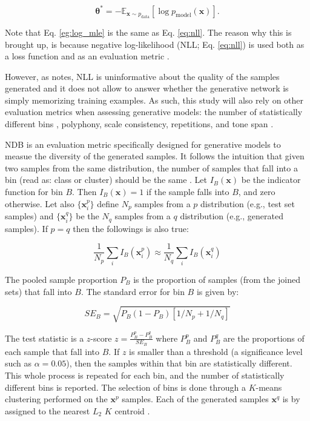\documentclass[a4paper]{book}
\begin{document}
\begin{equation}
    \bm{\theta^*} = - \mathbb{E}_{\mathbf{x} \sim p_{\text{data}}} [\log p_{\text{model}} (\bm{x})] \label{eq:nll}.
\end{equation}

Note that Eq. \ref{eg:log_mle} is the same as Eq. \ref{eq:nll}. The reason why this is brought up, is because negative log-likelihood (NLL; Eq. \ref{eq:nll}) is used both as a loss function and as an evaluation metric \parencite[also for generative models;][]{yu_seqgan_2016, borji_pros_2018}.

However, as \textcite{borji_pros_2018} notes, NLL is uninformative about the quality of the samples generated and it does not allow to answer whether the generative network is simply memorizing training examples. As such, this study will also rely on other evaluation metrics when assessing generative models: the number of statistically different bins \parencite[NDB;][]{richardson_gans_2018}, polyphony, scale consistency, repetitions, and tone span \parencite{mogren_c-rnn-gan_2016}.

NDB is an evaluation metric specifically designed for generative models to measue the diversity of the generated samples. It follows the intuition that given two samples from the same distribution, the number of samples that fall into a bin (read as: class or cluster) should be the same \parencite{richardson_gans_2018}. Let $I_B(\mathbf{x})$ be the indicator function for bin $B$. Then $I_B(\mathbf{x}) = 1$ if the sample falls into $B$, and zero otherwise. Let also $\{\mathbf{x}_i^p\}$ define $N_p$ samples from a $p$ distribution (e.g., test set samples) and $\{\mathbf{x}_i^q\}$ be the $N_q$ samples from a $q$ distribution (e.g., generated samples). If $p = q$ then the followings is also true:

\begin{equation}
    \frac{1}{N_p} \sum_i I_B(\mathbf{x}_i^p) \approx \frac{1}{N_q} \sum_i I_B(\mathbf{x}_i^q)
\end{equation}

The pooled sample proportion $P_B$ is the proportion of samples (from the joined sets) that fall into $B$. The standard error for bin $B$ is given by:

\begin{equation}
    SE_B = \sqrt{P_B (1 - P_B)[1 / N_p + 1 / N_q]}
\end{equation}

The test statistic is a $z$-score $z = \frac{P_B^p - P_B^q}{SE_B}$ where $P_B^p$ and $P_B^q$ are the proportions of each sample that fall into $B$. If $z$ is smaller than a threshold (a significance level such as $\alpha = 0.05$), then the samples within that bin are statistically different. This whole process is repeated for each bin, and the number of statistically different bins is reported. The selection of bins is done through a $K$-means clustering performed on the $\mathbf{x}^p$ samples. Each of the generated samples $\mathbf{x}^q$ is by assigned to the nearest $L_2$ $K$ centroid \parencite{richardson_gans_2018}.
\end{document}
